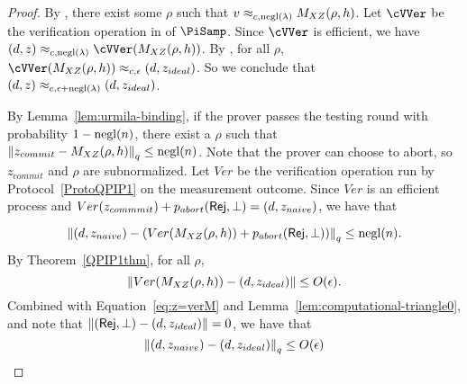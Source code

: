 \begin{proof}
	By ,
	there exist some $\rho$ such that
	$v\approx_{c,\operatorname{negl}(\lambda)}M_{XZ}(\rho,h)$.
	Let $\cVVer$ be the verification operation in  of $\PiSamp$.
	Since $\cVVer$ is efficient, we have
	$(d,z)\approx_{c, \negl(\lambda)}\cVVer(M_{XZ}(\rho, h))$.
	By , for all $\rho$, 
	$\cVVer(M_{XZ}(\rho, h))\approx_{c, \eps}(d, z_{ideal})$.
	So we conclude that
	$(d, z)\approx_{c, \epsilon+\operatorname{negl}(\lambda)}(d, z_{ideal})$.
	
	
	By Lemma~\ref{lem:urmila-binding}, if the prover passes the testing round with probability $1-\operatorname{negl}(n)$, there exist a $\rho$ such that $\left\lVert z_{commit}- M_{XZ}(\rho,h)\right\rVert_q \leq \operatorname{negl}(n)$. Note that the prover can choose to abort, so $z_{commit}$ and $\rho$ are subnormalized. Let $Ver$ be the verification operation run by Protocol~\ref{ProtoQPIP1} on the measurement outcome.  Since $Ver$ is an efficient process and $Ver(z_{commmit})+p_{abort}(\mathsf{Rej},\bot)=(d,z_{naive})$, we have that

\begin{equation} \label{eq:z=verM}
    \left\lVert(d,z_{naive})-(Ver( M_{XZ}(\rho,h))+p_{abort}(\mathsf{Rej},\bot))\right\rVert_q \leq \operatorname{negl}(n).
\end{equation}
 By Theorem~\ref{QPIP1thm}, for all $\rho$,
 \begin{equation}
     \left\lVert Ver(M_{XZ}(\rho,h))-(d,z_{ideal})\right\rVert \leq O(\epsilon).
 \end{equation}
   Combined with Equation~\ref{eq:z=verM} and Lemma~\ref{lem:computational-triangle0}, and note that $\left\lVert(\mathsf{Rej},\bot)-(d,z_{ideal})\right\rVert=0$, we have that
   \begin{equation}
       \left\lVert(d,z_{naive})-(d,z_{ideal})\right\rVert_q\leq O(\epsilon)
   \end{equation}
\end{proof}

